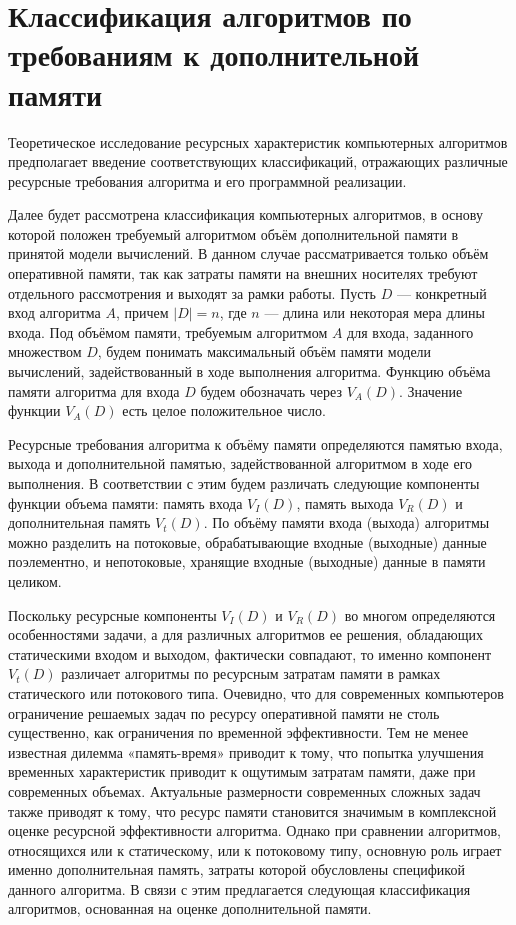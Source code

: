 \section{Классификация алгоритмов по требованиям к дополнительной памяти}

Теоретическое исследование ресурсных характеристик компьютерных алгоритмов предполагает введение соответствующих классификаций, отражающих различные ресурсные требования алгоритма и его программной реализации.~\cite{uljanov}

Далее будет рассмотрена классификация компьютерных алгоритмов, в основу которой положен требуемый алгоритмом объём дополнительной памяти в принятой модели вычислений. В данном случае рассматривается только объём оперативной
памяти, так как затраты памяти на внешних носителях требуют отдельного рассмотрения и выходят за рамки работы. Пусть $D$ --- конкретный вход алгоритма $A$, причем $|D| = n$, где $n$ --- длина или некоторая мера длины входа. Под объёмом памяти, требуемым алгоритмом $A$ для входа, заданного множеством $D$, будем понимать максимальный объём памяти модели вычислений, задействованный в ходе выполнения алгоритма. Функцию объёма памяти алгоритма для входа $D$ будем обозначать через $V_A(D)$. Значение функции $V_A(D)$ есть целое положительное число.~\cite{uljanov}

Ресурсные требования алгоритма к объёму памяти определяются памятью входа, выхода и дополнительной памятью, задействованной алгоритмом в ходе его выполнения. В соответствии с этим будем различать следующие компоненты функции объема памяти: память входа $V_I(D)$, память выхода $V_R(D)$ и дополнительная память $V_t(D)$. По объёму памяти входа (выхода) алгоритмы можно разделить на потоковые, обрабатывающие входные (выходные) данные поэлементно, и непотоковые, хранящие входные (выходные) данные в памяти целиком.~\cite{uljanov}

Поскольку ресурсные компоненты $V_I(D)$ и $V_R(D)$ во многом определяются особенностями задачи, а для различных алгоритмов ее решения, обладающих статическими входом и выходом, фактически совпадают, то именно компонент $V_t(D)$ различает алгоритмы по ресурсным затратам памяти в рамках статического или потокового типа. Очевидно, что для современных компьютеров ограничение решаемых задач по ресурсу оперативной памяти не столь существенно, как ограничения по временной эффективности. Тем не менее известная дилемма «память-время» приводит к тому, что попытка улучшения временных характеристик приводит к ощутимым затратам памяти, даже при современных объемах. Актуальные размерности современных сложных задач также приводят к тому, что ресурс памяти становится значимым в комплексной оценке ресурсной эффективности алгоритма. Однако при сравнении алгоритмов, относящихся или к статическому, или к потоковому типу, основную роль играет именно дополнительная память, затраты которой обусловлены спецификой данного алгоритма. В связи с этим предлагается следующая классификация алгоритмов, основанная на оценке дополнительной памяти.~\cite{uljanov}

